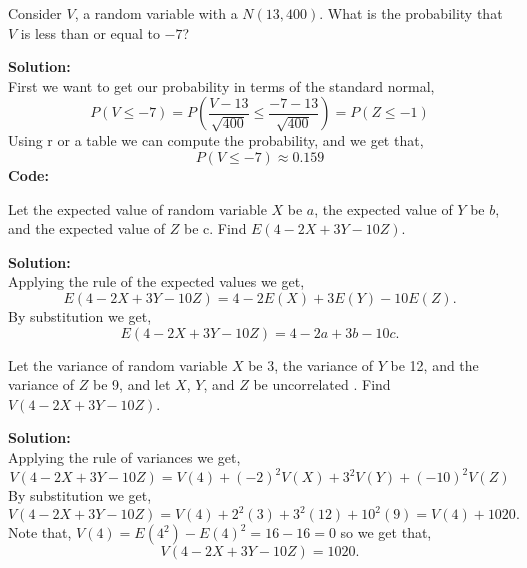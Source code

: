 \documentclass[12pt]{article}
\makeatletter
\theoremstyle{homework}
\newenvironment{exercise}[1]
{\def\@currentlabel{#1}\exercisecore}
{\endexercisecore}
\newcommand{\localhead}[1]{\par\smallskip\noindent\textbf{#1}\nobreak\\}%
\newcommand\solution{\localhead{Solution:}}
\makeatother
\begin{document}
\newpage

\begin{exercise}{4} Consider $V$, a random variable with a $N(13,400)$. What is the probability 
    that $V$ is less than or equal to $-7$?\\
    \solution First we want to get our probability in terms of the standard normal, 
    \begin{equation*}
        P(V\leq -7) = P\left(\frac{V - 13}{\sqrt{400}} \leq \frac{-7 - 13}{\sqrt{400}}\right) = P(Z \leq -1)
    \end{equation*}
    Using r or a table we can compute the probability, and we get that, 
    \begin{equation*}
        P(V\leq -7) \approx 0.159
    \end{equation*}
    \textbf{Code:}
		\begin{center}
			
		\end{center}
\end{exercise}
\newpage


\begin{exercise}{5} Let the expected value of random variable $X$ be $a$, the expected value of 
    $Y$ be $b$, and the expected value of $Z$ be c. Find $E(4-2X+3Y-10Z)$.\\
    \solution Applying the rule of the expected values we get, 
    \begin{equation*}
        E(4-2X+3Y-10Z) = 4-2E(X)+3E(Y)-10E(Z).
    \end{equation*} 
    By substitution we get, 
    \begin{equation*}
        E(4-2X+3Y-10Z) = 4-2a+3b-10c.
    \end{equation*}
\end{exercise}
\newpage


\begin{exercise}{6} Let the variance of random variable $X$ be 3, the variance of 
    $Y$ be 12, and the variance of $Z$ be 9, and let $X$, $Y$, and $Z$ be uncorrelated
    . Find $V(4-2X+3Y-10Z)$.\\
    \solution Applying the rule of variances we get,
    \begin{equation*}
        V(4-2X+3Y-10Z) = V(4)+(-2)^2V(X)+3^2V(Y)+(-10)^2V(Z)
    \end{equation*}
    By substitution we get, 
    \begin{equation*}
        V(4-2X+3Y-10Z) = V(4)+2^2(3)+3^2(12)+10^2(9) = V(4)+1020.
    \end{equation*}
    Note that, $V(4) = E(4^2) - E(4)^2 = 16 - 16 = 0$ so we get that,
    \begin{equation*}
        V(4-2X+3Y-10Z) = 1020.
    \end{equation*}

\end{exercise}
\newpage
\end{document}

